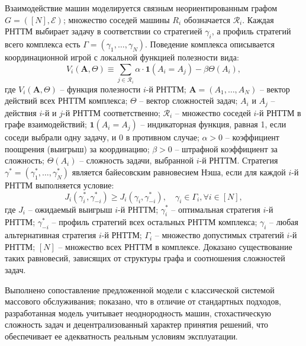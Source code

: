 Взаимодействие машин моделируется связным неориентированным графом $ G = ([N], \mathcal{E}) $; множество соседей машины $ R_i $ обозначается $ \mathcal{R}_i $. Каждая РНТТМ выбирает задачу в соответствии со стратегией $ \gamma_i $, а профиль стратегий всего комплекса есть $ \Gamma = (\gamma_1,\dots,\gamma_N) $. Поведение комплекса описывается координационной игрой с локальной функцией полезности вида:
\begin{equation}
    V_i(\mathbf{A},\Theta) \equiv \sum_{j \in \mathcal{R}_i} \alpha \cdot \mathbf{1}(A_i = A_j) - \beta \Theta(A_i),
\end{equation}
где $V_i(\mathbf{A},\Theta)$ -- функция полезности $i$-й РНТТМ; $\mathbf{A} = (A_1, \dots, A_N)$ -- вектор действий всех РНТТМ комплекса; $\Theta$ -- вектор сложностей задач; $A_i$ и $A_j$ -- действия $i$-й и $j$-й РНТТМ соответственно; $\mathcal{R}_i$ -- множество соседей $i$-й РНТТМ в графе взаимодействий; $\mathbf{1}(A_i = A_j)$ -- индикаторная функция, равная 1, если соседи выбрали одну задачу, и 0 в противном случае; $\alpha > 0$ -- коэффициент поощрения (выигрыш) за координацию; $\beta > 0$ -- штрафной коэффициент за сложность; $\Theta(A_i)$ -- сложность задачи, выбранной $i$-й РНТТМ. Стратегия $\gamma^* = (\gamma_1^*,\dots,\gamma_N^*)$ является байесовским равновесием Нэша, если для каждой $i$-й РНТТМ выполняется условие:
\begin{equation}
    J_i(\gamma_i^*, \gamma_{-i}^*) \ge J_i(\gamma_i, \gamma_{-i}^*), \quad \gamma_i \in \Gamma_i, \forall i \in [N],
\end{equation}
где $J_i$ -- ожидаемый выигрыш $i$-й РНТТМ; $\gamma_i^*$ -- оптимальная стратегия $i$-й РНТТМ; $\gamma_{-i}^*$ -- профиль стратегий всех остальных РНТТМ комплекса; $\gamma_i$ -- любая альтернативная стратегия $i$-й РНТТМ; $\Gamma_i$ -- множество допустимых стратегий $i$-й РНТТМ; $[N]$ -- множество всех РНТТМ в комплексе. Доказано существование таких равновесий, зависящих от структуры графа и соотношения сложностей задач.

Выполнено сопоставление предложенной модели с классической системой массового обслуживания; показано, что в отличие от стандартных подходов, разработанная модель учитывает неоднородность машин, стохастическую сложность задач и децентрализованный характер принятия решений, что обеспечивает ее адекватность реальным условиям эксплуатации.

\FloatBarrier

{}
\label{sec:algo}

